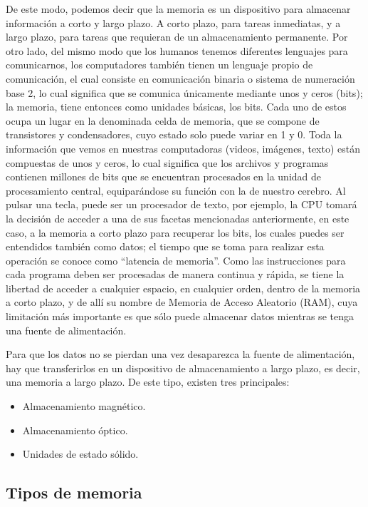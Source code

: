 \documentclass{article}
\begin{document}
De este modo, podemos decir que la memoria es un dispositivo para almacenar información a corto y largo plazo. A corto plazo, para tareas inmediatas, y a largo plazo, para tareas que requieran de un almacenamiento permanente.
Por otro lado, del mismo modo que los humanos tenemos diferentes lenguajes para comunicarnos, los computadores también tienen un lenguaje propio de comunicación, el cual consiste en comunicación binaria o sistema de numeración base 2, lo cual significa que se comunica únicamente mediante unos y ceros (bits); la memoria, tiene entonces como unidades básicas, los bits. Cada uno de estos ocupa un lugar en la denominada celda de memoria, que se compone de transistores y condensadores, cuyo estado solo puede variar en 1 y 0.  Toda la información que vemos en nuestras computadoras (videos, imágenes, texto) están compuestas de unos y ceros, lo cual significa que los archivos y programas contienen millones de bits que se encuentran procesados en la unidad de procesamiento central, equiparándose su función con la de nuestro cerebro. 
Al pulsar una tecla, puede ser un procesador de texto, por ejemplo, la CPU tomará la decisión de acceder a una de sus facetas mencionadas anteriormente, en este caso, a la memoria a corto plazo para recuperar los bits, los cuales puedes ser entendidos también como datos; el tiempo que se toma para realizar esta operación se conoce como “latencia de memoria”. Como las instrucciones para cada programa deben ser procesadas de manera continua y rápida, se tiene la libertad de acceder a cualquier espacio, en cualquier orden, dentro de la memoria a corto plazo, y de allí su nombre de Memoria de Acceso Aleatorio (RAM), cuya limitación más importante es que sólo puede almacenar datos mientras se tenga una fuente de alimentación.
\vspace{0.2cm}

Para que los datos no se pierdan una vez desaparezca la fuente de alimentación, hay que transferirlos en un dispositivo de almacenamiento a largo plazo, es decir, una memoria a largo plazo. De este tipo, existen tres principales:
\begin{itemize}
\item Almacenamiento magnético.
\item Almacenamiento óptico.
\item Unidades de estado sólido.
\end{itemize}
\subsection{Tipos de memoria}
\end{document}
